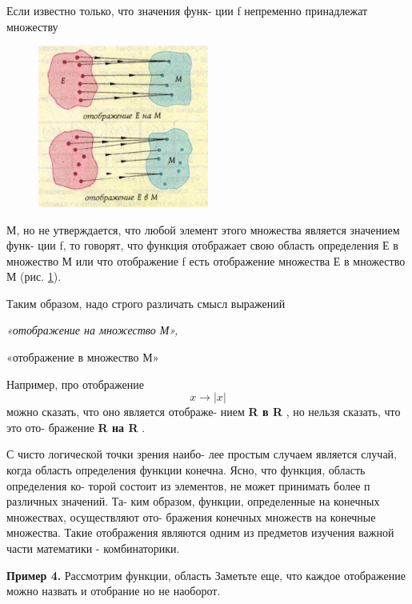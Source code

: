 \begin{multicols}{2}
Если известно только, что значения функ-
ции f непременно принадлежат множеству
\begin{figure}[H]
\includegraphics[width = 0.5\textwidth]{ris_1}
\caption{}
\label{fig:pic_1}
\end{figure}
М, но не утверждается, что любой элемент
этого множества является значением функ-
ции f, то говорят, что функция отображает
свою область определения Е в множество М
или что отображение f есть отображение
множества Е в множество М (рис. \ref{fig:pic_1}).

Таким образом, надо строго различать
смысл выражений

{\em «отображение на множество М»,

«отображение в множество М»}

Например, про отображение
$$x \rightarrow |x|$$
можно сказать, что оно является отображе-
нием {\bf R в R }, но нельзя сказать, что это ото-
бражение {\bf R на R} .

С чисто логической точки зрения наибо-
лее простым случаем является случай, когда
область определения функции конечна.
Ясно, что функция, область определения ко-
торой состоит из элементов, не может
принимать более п различных значений. Та-
ким образом, функции, определенные на
конечных множествах, осуществляют ото-
бражения конечных множеств на конечные
множества. Такие отображения являются
одним из предметов изучения важной части
математики - комбинаторики.

{ \bf Пример 4.} Рассмотрим функции, область
Заметьте еще, что каждое отображение можно
назвать и отобрание
но не наоборот.

\end{multicols}











